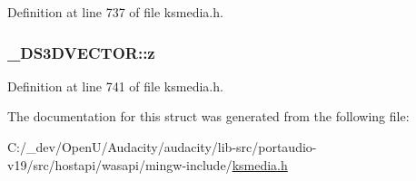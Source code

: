 Definition at line 737 of file ksmedia.\+h.

\subsubsection[{\texorpdfstring{z}{z}}]{ \+\_\+\+D\+S3\+D\+V\+E\+C\+T\+O\+R\+::z}\hypertarget{struct___d_s3_d_v_e_c_t_o_r_af5cc5b2fe7bc810dee1470e4d21752b1}{}\label{struct___d_s3_d_v_e_c_t_o_r_af5cc5b2fe7bc810dee1470e4d21752b1}


Definition at line 741 of file ksmedia.\+h.



The documentation for this struct was generated from the following file\+:\begin{DoxyCompactItemize}
\item 
C\+:/\+\_\+dev/\+Open\+U/\+Audacity/audacity/lib-\/src/portaudio-\/v19/src/hostapi/wasapi/mingw-\/include/\hyperlink{ksmedia_8h}{ksmedia.\+h}\end{DoxyCompactItemize}
